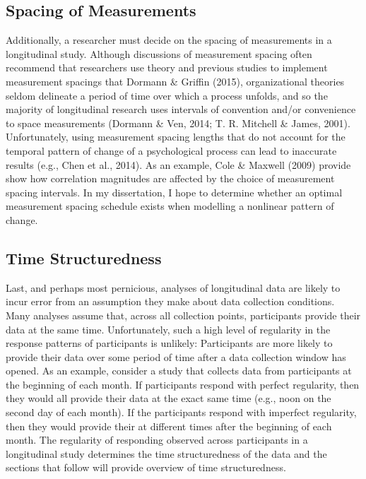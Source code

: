 \documentclass[
12pt, %
twoside,
english]{guelphthesis}
\theoremstyle{definition}
\theoremstyle{definition}
\theoremstyle{definition}
\theoremstyle{definition}
\theoremstyle{remark}
\begin{document}
\hypertarget{spacing-of-measurements}{%
\subsection{Spacing of Measurements}\label{spacing-of-measurements}}

Additionally, a researcher must decide on the spacing of measurements in a longitudinal study. Although discussions of measurement spacing often recommend that researchers use theory and previous studies to implement measurement spacings that Dormann \& Griffin (2015), organizational theories seldom delineate a period of time over which a process unfolds, and so the majority of longitudinal research uses intervals of convention and/or convenience to space measurements (Dormann \& Ven, 2014; T. R. Mitchell \& James, 2001). Unfortunately, using measurement spacing lengths that do not account for the temporal pattern of change of a psychological process can lead to inaccurate results (e.g., Chen et al., 2014). As an example, Cole \& Maxwell (2009) provide show how correlation magnitudes are affected by the choice of measurement spacing intervals. In my dissertation, I hope to determine whether an optimal measurement spacing schedule exists when modelling a nonlinear pattern of change.

\hypertarget{time-structuredness}{%
\subsection{Time Structuredness}\label{time-structuredness}}

Last, and perhaps most pernicious, analyses of longitudinal data are likely to incur error from an assumption they make about data collection conditions. Many analyses assume that, across all collection points, participants provide their data at the same time. Unfortunately, such a high level of regularity in the response patterns of participants is unlikely: Participants are more likely to provide their data over some period of time after a data collection window has opened. As an example, consider a study that collects data from participants at the beginning of each month. If participants respond with perfect regularity, then they would all provide their data at the exact same time (e.g., noon on the second day of each month). If the participants respond with imperfect regularity, then they would provide their at different times after the beginning of each month. The regularity of responding observed across participants in a longitudinal study determines the time structuredness of the data and the sections that follow will provide overview of time structuredness.
\end{document}

